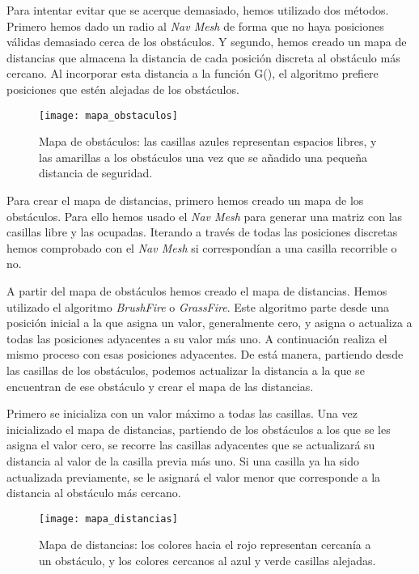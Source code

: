 Para intentar evitar que se acerque demasiado, hemos utilizado dos métodos. Primero hemos dado un radio al \textit{Nav Mesh} de forma que no haya posiciones válidas demasiado cerca de los obstáculos. Y segundo, hemos creado un mapa de distancias que almacena la distancia de cada posición discreta al obstáculo más cercano. Al incorporar esta distancia a la función G(), el algoritmo prefiere posiciones que estén alejadas de los obstáculos.

\begin{figure}[htpb]
    \centering
    \texttt{[image: mapa\_obstaculos]}
    \caption[Representación del mapa de obstáculos]{Mapa de obstáculos: las casillas azules representan espacios libres, y las amarillas a los obstáculos una vez que se añadido una pequeña distancia de seguridad.}
    \label{fig:basics AFM sketch}
\end{figure}

Para crear el mapa de distancias, primero hemos creado un mapa de los obstáculos. Para ello hemos usado el \textit{Nav Mesh} para generar una matriz con las casillas libre y las ocupadas. Iterando a través de todas las posiciones discretas hemos comprobado con el \textit{Nav Mesh} si correspondían a una casilla recorrible o no.

A partir del mapa de obstáculos hemos creado el mapa de distancias\label{mapaobstaculos}. Hemos utilizado el algoritmo \textit{BrushFire} o \textit{GrassFire}. Este algoritmo parte desde una posición inicial a la que asigna un valor, generalmente cero, y asigna o actualiza a todas las posiciones adyacentes a su valor más uno. A continuación realiza el mismo proceso con esas posiciones adyacentes. De está manera, partiendo desde las casillas de los obstáculos, podemos actualizar la distancia a la que se encuentran de ese obstáculo y crear el mapa de las distancias.

Primero se inicializa con un valor máximo a todas las casillas. Una vez inicializado el mapa de distancias, partiendo de los obstáculos a los que se les asigna el valor cero, se recorre las casillas adyacentes que se actualizará su distancia al valor de la casilla previa más uno. Si una casilla ya ha sido actualizada previamente, se le asignará el valor menor que corresponde a la distancia al obstáculo más cercano.

\begin{figure}[htpb]
    \centering
    \texttt{[image: mapa\_distancias]}
    \caption[Representación del mapa de distancias]{Mapa de distancias: los colores hacia el rojo representan cercanía a un obstáculo, y los colores cercanos al azul y verde casillas alejadas.}
    \label{fig:basics AFM sketch}
\end{figure}

